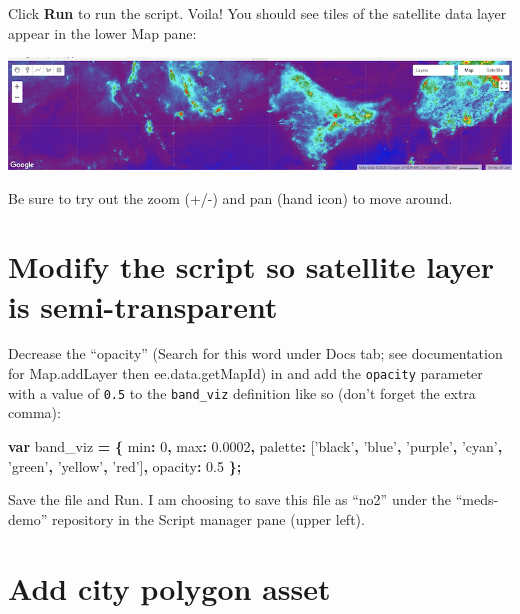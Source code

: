 \documentclass[]{book}
\newenvironment{Shaded}{\begin{snugshade}}{\end{snugshade}}
\newcommand{\DataTypeTok}[1]{\textcolor[rgb]{0.13,0.29,0.53}{#1}}
\newcommand{\DecValTok}[1]{\textcolor[rgb]{0.00,0.00,0.81}{#1}}
\newcommand{\FloatTok}[1]{\textcolor[rgb]{0.00,0.00,0.81}{#1}}
\newcommand{\KeywordTok}[1]{\textcolor[rgb]{0.13,0.29,0.53}{\textbf{#1}}}
\newcommand{\NormalTok}[1]{#1}
\newcommand{\OperatorTok}[1]{\textcolor[rgb]{0.81,0.36,0.00}{\textbf{#1}}}
\newcommand{\StringTok}[1]{\textcolor[rgb]{0.31,0.60,0.02}{#1}}
\begin{document}
Click \textbf{Run} to run the script. Voila! You should see tiles of the satellite data layer appear in the lower Map pane:

\includegraphics{images/gee_run-init-dataset.png}

Be sure to try out the zoom (+/-) and pan (hand icon) to move around.

\hypertarget{modify-the-script-so-satellite-layer-is-semi-transparent}{%
\section{Modify the script so satellite layer is semi-transparent}\label{modify-the-script-so-satellite-layer-is-semi-transparent}}

Decrease the ``opacity'' (Search for this word under Docs tab; see documentation for Map.addLayer then ee.data.getMapId) in and add the \texttt{opacity} parameter with a value of \texttt{0.5} to the \texttt{band\_viz} definition like so (don't forget the extra comma):

\begin{Shaded}
\begin{Highlighting}[]
\KeywordTok{var}\NormalTok{ band_viz }\OperatorTok{=} \OperatorTok{\{}
  \DataTypeTok{min}\OperatorTok{:} \DecValTok{0}\OperatorTok{,}
  \DataTypeTok{max}\OperatorTok{:} \FloatTok{0.0002}\OperatorTok{,}
  \DataTypeTok{palette}\OperatorTok{:}\NormalTok{ [}\StringTok{'black'}\OperatorTok{,} \StringTok{'blue'}\OperatorTok{,} \StringTok{'purple'}\OperatorTok{,} \StringTok{'cyan'}\OperatorTok{,} \StringTok{'green'}\OperatorTok{,} \StringTok{'yellow'}\OperatorTok{,} \StringTok{'red'}\NormalTok{]}\OperatorTok{,}
  \DataTypeTok{opacity}\OperatorTok{:} \FloatTok{0.5}
\OperatorTok{\};}
\end{Highlighting}
\end{Shaded}

Save the file and Run. I am choosing to save this file as ``no2'' under the ``meds-demo'' repository in the Script manager pane (upper left).

\hypertarget{add-city-polygon-asset}{%
\section{Add city polygon asset}\label{add-city-polygon-asset}}
\end{document}
